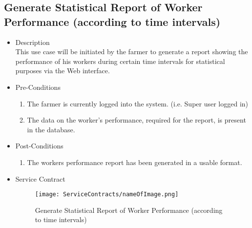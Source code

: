 \documentclass[11pt,fleqn]{book} %
\begin{document}
\subsection{Generate Statistical Report of Worker Performance (according to time intervals)}
\begin{itemize}
	\item Description\\
	This use case will be initiated by the farmer to generate a report showing the performance of his workers during certain time intervals for statistical purposes via the Web interface.
	\item Pre-Conditions
	\begin{enumerate}
		\item The farmer is currently logged into the system. (i.e. Super user logged in)
		\item The data on the worker’s performance, required for the report, is present in the database.		
	\end{enumerate}
	\item Post-Conditions
	\begin{enumerate}
		\item The workers performance report has been generated in a usable format.
	\end{enumerate}
	\item Service Contract
	\begin{figure}
		\texttt{[image: ServiceContracts/nameOfImage.png]}
		\caption{Generate Statistical Report of Worker Performance (according to time intervals)}
	\end{figure}
\end{itemize}
\end{document}
